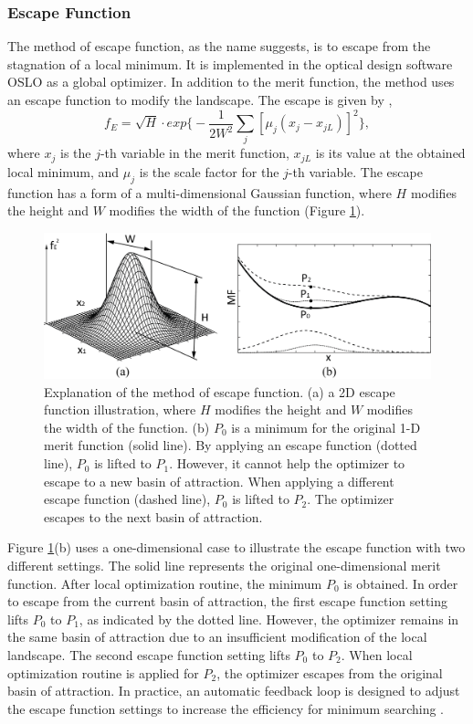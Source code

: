 \subsubsection{Escape Function}
The method of escape function, as the name suggests, is to escape from the stagnation of a local minimum. It is implemented in the optical design software OSLO \cite{OsloSW} as a global optimizer. In addition to the merit function, the method uses an escape function to modify the landscape. The escape is given by \cite{Isshiki1998},
\begin{equation}
f_{E} = \sqrt{H} \cdot exp \Bigg\{ - \frac{1}{2W^{2}}\sum_{j} \left[\mu_{j}(x_j - x_{jL}) \right]^2 \Bigg\}, 
\end{equation}where $x_j$ is the $j$-th variable in the merit function, $x_{jL}$ is its value at the obtained local minimum, and $\mu_j$ is the scale factor for the $j$-th variable. The escape function has a form of a multi-dimensional Gaussian function, where $H$ modifies the height and $W$ modifies the width of the function (Figure \ref{fig: Escape_function_explained}). 
\begin{figure}
    \centering
    \includegraphics[scale=0.58]{chapter-1/figures/EscapeFunction_explained.png}
    \caption{Explanation of the method of escape function. (a) a 2D escape function illustration, where $H$ modifies the height and $W$ modifies the width of the function. (b) $P_0$ is a minimum for the original 1-D merit function (solid line). By applying an escape function (dotted line), $P_0$ is lifted to $P_1$. However, it cannot help the optimizer to escape to a new basin of attraction. When applying a different escape function (dashed line), $P_0$ is lifted to $P_2$. The optimizer escapes to the next basin of attraction.}
    \label{fig: Escape_function_explained}
\end{figure}
Figure \ref{fig: Escape_function_explained}(b) uses a one-dimensional case to illustrate the escape function with two different settings. The solid line represents the original one-dimensional merit function. After local optimization routine, the minimum $P_0$ is obtained. In order to escape from the current basin of attraction, the first escape function setting lifts $P_0$ to $P_1$, as indicated by the dotted line. However, the optimizer remains in the same basin of attraction due to an insufficient modification of the local landscape. The second escape function setting lifts $P_0$ to $P_2$. When local optimization routine is applied for $P_2$, the optimizer escapes from the original basin of attraction. In practice, an automatic feedback loop is designed to adjust the escape function settings to increase the efficiency for minimum searching \cite{Isshiki1998}.


